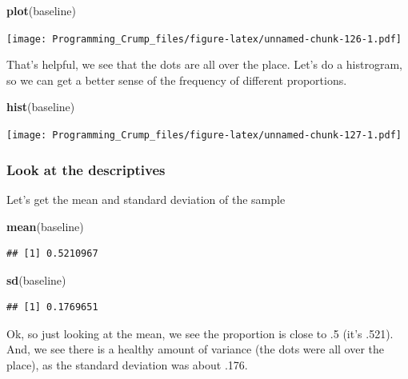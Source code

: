 \documentclass[]{book}
\newenvironment{Shaded}{\begin{snugshade}}{\end{snugshade}}
\newcommand{\KeywordTok}[1]{\textcolor[rgb]{0.13,0.29,0.53}{\textbf{{#1}}}}
\newcommand{\NormalTok}[1]{{#1}}
\theoremstyle{definition}
\theoremstyle{definition}
\theoremstyle{definition}
\theoremstyle{remark}
\begin{document}
\begin{Shaded}
\begin{Highlighting}[]
\KeywordTok{plot}\NormalTok{(baseline)}
\end{Highlighting}
\end{Shaded}

\texttt{[image: Programming\_Crump\_files/figure-latex/unnamed-chunk-126-1.pdf]}

That's helpful, we see that the dots are all over the place. Let's do a
histrogram, so we can get a better sense of the frequency of different
proportions.

\begin{Shaded}
\begin{Highlighting}[]
\KeywordTok{hist}\NormalTok{(baseline)}
\end{Highlighting}
\end{Shaded}

\texttt{[image: Programming\_Crump\_files/figure-latex/unnamed-chunk-127-1.pdf]}

\subsubsection{Look at the descriptives}\label{look-at-the-descriptives}

Let's get the mean and standard deviation of the sample

\begin{Shaded}
\begin{Highlighting}[]
\KeywordTok{mean}\NormalTok{(baseline)}
\end{Highlighting}
\end{Shaded}

\begin{verbatim}
## [1] 0.5210967
\end{verbatim}

\begin{Shaded}
\begin{Highlighting}[]
\KeywordTok{sd}\NormalTok{(baseline)}
\end{Highlighting}
\end{Shaded}

\begin{verbatim}
## [1] 0.1769651
\end{verbatim}

Ok, so just looking at the mean, we see the proportion is close to .5
(it's .521). And, we see there is a healthy amount of variance (the dots
were all over the place), as the standard deviation was about .176.
\end{document}
